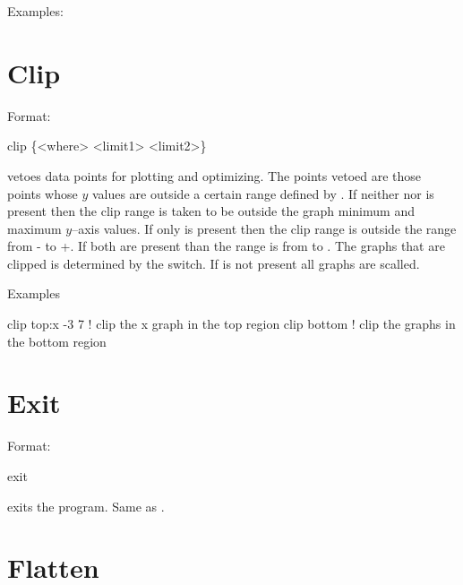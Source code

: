 Examples:


\section{Clip}
\label{s:clip}

Format:
\begin{example}
  clip \{<where> <limit1> <limit2>\}
\end{example}

\vskip 0.2in  vetoes data points for plotting and
optimizing. The points vetoed are those points whose $y$ values are
outside a certain range defined by  . If
neither  nor  is present then the clip range
is taken to be outside the graph minimum and maximum $y$--axis
values. If only  is present then the clip range is
outside the range from - to +. If both are
present than the range is from  to .  The
graphs that are clipped is determined by the  switch.  If
 is not present all graphs are scalled.

Examples
\begin{example}
  clip top:x -3  7  ! clip the x graph in the top region
  clip bottom       ! clip the graphs in the bottom region
\end{example}

\section{Exit}
\label{s:exit}

Format:
\begin{example}
  exit
\end{example}

\vskip 0.2in
 exits the program. Same as .

\section{Flatten}
\label{s:flatten}

